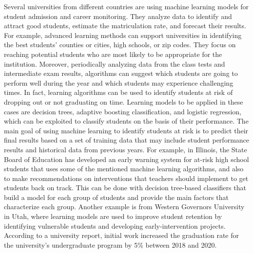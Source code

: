 Several universities from different countries are using machine learning \hbox{models} for student admission and career monitoring. They analyze data to identify and attract good students, estimate the matriculation rate, and forecast their results. For example, advanced learning methods can support universities in identifying the best students' counties or cities, high schools, or zip codes. They focus on reaching potential students who are most likely to be appropriate for the institution. Moreover, periodically analyzing data from the class tests and intermediate exam results, algorithms can suggest which students are going to perform well during the year and which students may experience challenging times. In fact, learning algorithms can be used to identify students at risk of dropping out or not graduating on time. Learning models to be applied in these cases are decision trees, adaptive boosting classification, and logistic regression, which can be exploited to classify students on the basis of their performance. The main goal of using machine learning to identify students at risk is to predict their final results based on a set of training data that may include student performance results and historical data from previous years. For example, in Illinois, the State Board of Education has developed an early warning system for at-risk high school students that uses some of the mentioned machine learning algorithms, and also to make recommendations on interventions that teachers should implement to get students back on track. This can be done with decision tree-based classifiers that build a model for each group of students and provide the main factors that characterize each group. Another example is from Western Governors University in Utah, where learning models are used to improve student retention by identifying vulnerable students and developing early-intervention projects. According to a university report, initial work increased the graduation rate for the university's undergraduate program by 5\% between 2018 and 2020.

